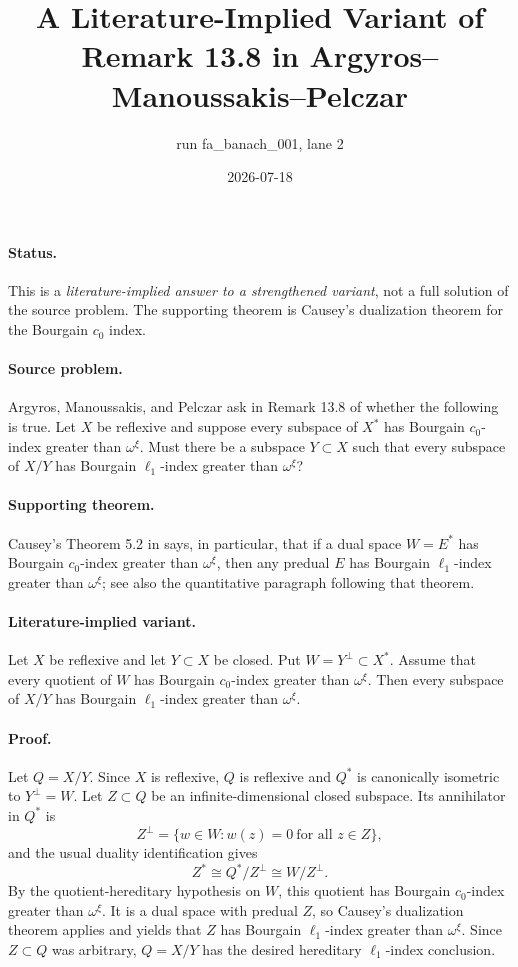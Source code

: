 \documentclass[11pt]{article}
\title{A Literature-Implied Variant of Remark 13.8 in Argyros--Manoussakis--Pelczar}
\author{run fa\_banach\_001, lane 2}
\date{2026-07-18}
\newcommand{\ellone}{\ell_1}
\newcommand{\czero}{c_0}
\newcommand{\omegaord}{\omega}
\begin{document}
\maketitle

\paragraph{Status.}
This is a \emph{literature-implied answer to a strengthened variant}, not a full solution of the source problem.  The supporting theorem is Causey's dualization theorem for the Bourgain $\czero$ index.

\paragraph{Source problem.}
Argyros, Manoussakis, and Pelczar ask in Remark 13.8 of \cite{AMP} whether the following is true.  Let $X$ be reflexive and suppose every subspace of $X^*$ has Bourgain $\czero$-index greater than $\omegaord^\xi$.  Must there be a subspace $Y\subset X$ such that every subspace of $X/Y$ has Bourgain $\ellone$-index greater than $\omegaord^\xi$?

\paragraph{Supporting theorem.}
Causey's Theorem 5.2 in \cite{Causey} says, in particular, that if a dual space $W=E^*$ has Bourgain $\czero$-index greater than $\omegaord^\xi$, then any predual $E$ has Bourgain $\ellone$-index greater than $\omegaord^\xi$; see also the quantitative paragraph following that theorem.

\paragraph{Literature-implied variant.}
Let $X$ be reflexive and let $Y\subset X$ be closed.  Put $W=Y^\perp\subset X^*$.  Assume that every quotient of $W$ has Bourgain $\czero$-index greater than $\omegaord^\xi$.  Then every subspace of $X/Y$ has Bourgain $\ellone$-index greater than $\omegaord^\xi$.

\paragraph{Proof.}
Let $Q=X/Y$.  Since $X$ is reflexive, $Q$ is reflexive and $Q^*$ is canonically isometric to $Y^\perp=W$.  Let $Z\subset Q$ be an infinite-dimensional closed subspace.  Its annihilator in $Q^*$ is
\[
  Z^\perp=\{w\in W: w(z)=0\ \text{for all }z\in Z\},
\]
and the usual duality identification gives
\[
  Z^*\cong Q^*/Z^\perp \cong W/Z^\perp .
\]
By the quotient-hereditary hypothesis on $W$, this quotient has Bourgain $\czero$-index greater than $\omegaord^\xi$.  It is a dual space with predual $Z$, so Causey's dualization theorem applies and yields that $Z$ has Bourgain $\ellone$-index greater than $\omegaord^\xi$.  Since $Z\subset Q$ was arbitrary, $Q=X/Y$ has the desired hereditary $\ellone$-index conclusion.
\end{document}

